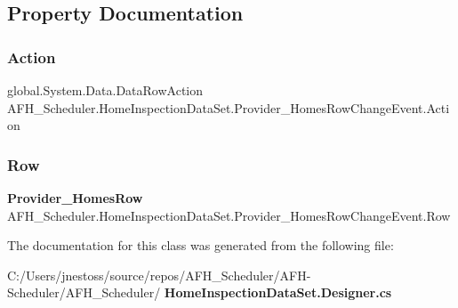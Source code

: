 \subsection{Property Documentation}
\mbox{\label{class_a_f_h___scheduler_1_1_home_inspection_data_set_1_1_provider___homes_row_change_event_afb7420ff30d8f3a80364673976e92178}} 
\subsubsection{Action}
{\footnotesize\ttfamily global.\+System.\+Data.\+Data\+Row\+Action A\+F\+H\+\_\+\+Scheduler.\+Home\+Inspection\+Data\+Set.\+Provider\+\_\+\+Homes\+Row\+Change\+Event.\+Action\hspace{0.3cm}{\ttfamily [get]}}

\mbox{\label{class_a_f_h___scheduler_1_1_home_inspection_data_set_1_1_provider___homes_row_change_event_a0850e2a40ec7ba6a5f5c3d4d7a2e5a7d}} 
\subsubsection{Row}
{\footnotesize\ttfamily \textbf{ Provider\+\_\+\+Homes\+Row} A\+F\+H\+\_\+\+Scheduler.\+Home\+Inspection\+Data\+Set.\+Provider\+\_\+\+Homes\+Row\+Change\+Event.\+Row\hspace{0.3cm}{\ttfamily [get]}}



The documentation for this class was generated from the following file\+:\begin{DoxyCompactItemize}
\item 
C\+:/\+Users/jnestoss/source/repos/\+A\+F\+H\+\_\+\+Scheduler/\+A\+F\+H-\/\+Scheduler/\+A\+F\+H\+\_\+\+Scheduler/\textbf{ Home\+Inspection\+Data\+Set.\+Designer.\+cs}\end{DoxyCompactItemize}
